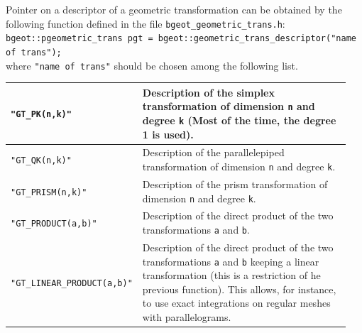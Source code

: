 \documentclass[11pt,a4paper]{article}
\begin{document}
Pointer on a descriptor of a geometric transformation can be obtained by the following function defined in the file {\tt bgeot\_geometric\_trans.h}:\\[0.5cm]
{\tt bgeot::pgeometric\_trans pgt = bgeot::geometric\_trans\_descriptor("name of trans"); }\\[0.5cm]
where {\tt "name of trans"} should be chosen among the following list.
\begin{center} \begin{tabular}{|m{0.3\linewidth}|m{0.65\linewidth}|} \hline
{\tt "GT\_PK(n,k)"} & Description of the simplex transformation of dimension {\tt n} and degree {\tt k} (Most of the time, the degree 1 is used).\\ \hline
{\tt "GT\_QK(n,k)"} & Description of the parallelepiped transformation of dimension {\tt n} and degree {\tt k}.\\ \hline
{\tt "GT\_PRISM(n,k)"} & Description of the prism transformation of dimension {\tt n} and degree {\tt k}. \\ \hline
{\tt "GT\_PRODUCT(a,b)"} & Description of the direct product of the two transformations {\tt a} and {\tt b}.\\ \hline
{\tt "GT\_LINEAR\_PRODUCT(a,b)"} & Description of the direct product of the two transformations {\tt a} and {\tt b} keeping a linear transformation (this is a restriction of he previous function). This allows, for instance, to use exact integrations on regular meshes with parallelograms.\\ \hline
\end{tabular} \end{center}
\end{document}
